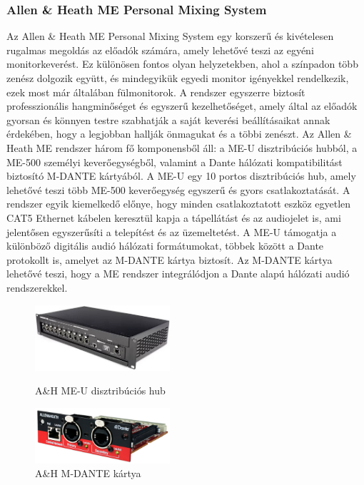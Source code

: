\subsubsection{Allen \& Heath ME Personal Mixing System} %
Az Allen \& Heath ME Personal Mixing System egy korszerű és kivételesen
rugalmas megoldás az előadók számára, amely lehetővé teszi az egyéni
monitorkeverést. Ez különösen fontos olyan helyzetekben,
ahol a színpadon több zenész dolgozik együtt, és mindegyikük
egyedi monitor igényekkel rendelkezik, ezek most már általában fülmonitorok.
A rendszer egyszerre biztosít professzionális hangminőséget és egyszerű kezelhetőséget, amely által az
előadók gyorsan és könnyen testre szabhatják a saját keverési beállításaikat
annak érdekében, hogy a legjobban hallják önmagukat és a többi zenészt.
Az Allen \& Heath ME rendszer három fő komponensből áll: a ME-U 
disztribúciós hubból, a ME-500 személyi keverőegységből, valamint a 
Dante hálózati kompatibilitást biztosító M-DANTE kártyából.
A ME-U egy 10 portos disztribúciós hub, amely lehetővé teszi több 
ME-500 keverőegység egyszerű és gyors csatlakoztatását. A rendszer egyik
kiemelkedő előnye, hogy minden csatlakoztatott eszköz egyetlen CAT5 
Ethernet kábelen keresztül kapja a tápellátást és az audiojelet is, ami
jelentősen egyszerűsíti a telepítést és az üzemeltetést. A ME-U támogatja 
a különböző digitális audió hálózati formátumokat, többek között a 
Dante protokollt is, amelyet az M-DANTE kártya biztosít.
Az M-DANTE kártya lehetővé teszi, hogy a ME rendszer integrálódjon 
a Dante alapú hálózati audió rendszerekkel.
\begin{figure}[H]
    \centering
    \begin{minipage}{0.45\textwidth}
        \centering
        \includegraphics[width=50mm, keepaspectratio]{figures/me_u.jpg}
        \caption{A\&H ME-U disztribúciós hub}\label{fig:me_u}
    \end{minipage}\hfill
    \begin{minipage}{0.45\textwidth}
        \centering
        \includegraphics[width=50mm, keepaspectratio]{figures/m_dante.jpg}
        \caption{A\&H M-DANTE kártya}\label{fig:m_dante}
    \end{minipage}
\end{figure}

